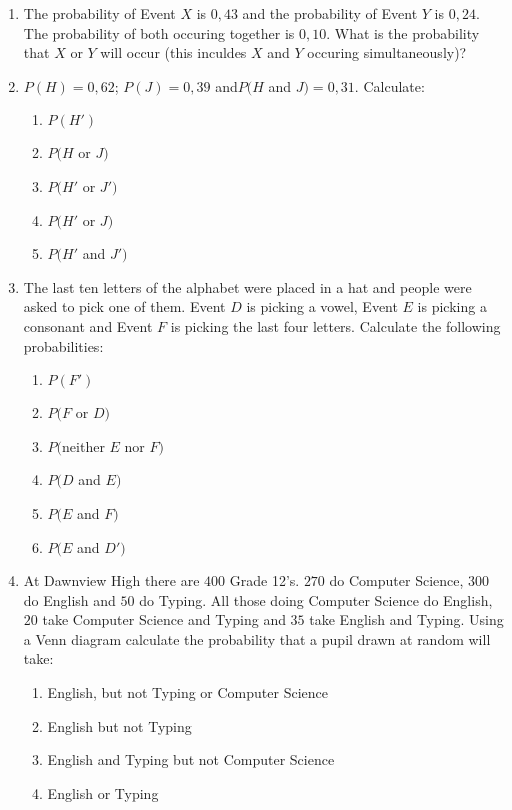 \begin{eocexercises}{}
\begin{enumerate}
\item The probability of Event $X$ is $0,43$ and the probability of Event $Y$ is $0,24$. The probability of both occuring together is $0,10$. What is the probability that $X$ or $Y$ will occur (this inculdes $X$ and $Y$ occuring simultaneously)?  
\item$ P(H)=0,62$; $P(J)=0,39$ and$ P(H$ and $J)=0,31$. Calculate:
	\begin{enumerate}
	\item $P(H')$ 
	\item $P(H$ or $J)$
	\item $P(H'$ or $J')$
	\item $P(H'$ or $J)$
	\item $P(H'$ and $J')$
	\end{enumerate}
\item The last ten letters of the alphabet were placed in a hat and people were asked to pick one of them. Event $D$ is picking a vowel, Event $E$ is picking a consonant and Event $F$ is picking the last four letters. Calculate the following probabilities:
	\begin{enumerate}
	\item $P(F')$ 
	\item $P(F$ or $D)$
	\item $P($neither $E$ nor $F)$
	\item $P(D$ and $E)$
	\item $P(E$ and $F)$
	\item $P(E$ and $D')$
	\end{enumerate}
\item At Dawnview High there are $400$ Grade 12's. $270$ do Computer Science, $300$ do English and $50$ do Typing. All those doing Computer Science do English, $20$ take Computer Science and Typing and $35$ take English and Typing. Using a Venn diagram calculate the probability that a pupil drawn at random will take:
	\begin{enumerate}
	\item English, but not Typing or Computer Science 
	\item English but not Typing
	\item English and Typing but not Computer Science
	\item English or Typing
	\end{enumerate}   
\end{enumerate}


\practiceinfo
\end{eocexercises} 








\appendix
